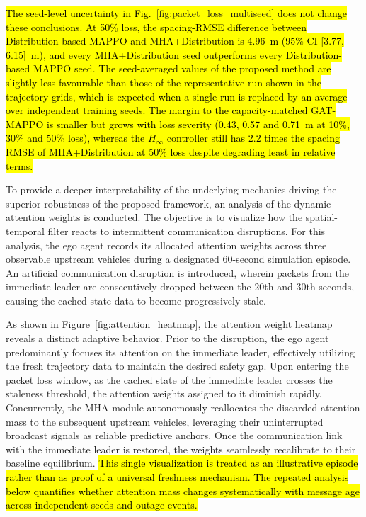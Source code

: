 \documentclass{ieeeaccess}
\begin{document}
\hl{The seed-level uncertainty in Fig.~\ref{fig:packet_loss_multiseed} does not change these conclusions. At 50\% loss, the spacing-RMSE difference between Distribution-based MAPPO and MHA+Distribution is 4.96~m (95\% CI [3.77, 6.15]~m), and every MHA+Distribution seed outperforms every Distribution-based MAPPO seed. The seed-averaged values of the proposed method are slightly less favourable than those of the representative run shown in the trajectory grids, which is expected when a single run is replaced by an average over independent training seeds. The margin to the capacity-matched GAT-MAPPO is smaller but grows with loss severity (0.43, 0.57 and 0.71~m at 10\%, 30\% and 50\% loss), whereas the $H_\infty$ controller still has 2.2 times the spacing RMSE of MHA+Distribution at 50\% loss despite degrading least in relative terms.} %

To provide a deeper interpretability of the underlying mechanics driving the superior robustness of the proposed framework, an analysis of the dynamic attention weights is conducted. The objective is to visualize how the spatial-temporal filter reacts to intermittent communication disruptions. For this analysis, the ego agent records its allocated attention weights across three observable upstream vehicles during a designated 60-second simulation episode. An artificial communication disruption is introduced, wherein packets from the immediate leader are consecutively dropped between the 20th and 30th seconds, causing the cached state data to become progressively stale.

As shown in Figure~\ref{fig:attention_heatmap}, the attention weight heatmap reveals a distinct adaptive behavior. Prior to the disruption, the ego agent predominantly focuses its attention on the immediate leader, effectively utilizing the fresh trajectory data to maintain the desired safety gap. Upon entering the packet loss window, as the cached state of the immediate leader crosses the staleness threshold, the attention weights assigned to it diminish rapidly. Concurrently, the MHA module autonomously reallocates the discarded attention mass to the subsequent upstream vehicles, leveraging their uninterrupted broadcast signals as reliable predictive anchors. Once the communication link with the immediate leader is restored, the weights seamlessly recalibrate to their baseline equilibrium. \hl{This single visualization is treated as an illustrative episode rather than as proof of a universal freshness mechanism. The repeated analysis below quantifies whether attention mass changes systematically with message age across independent seeds and outage events.}
\end{document}
